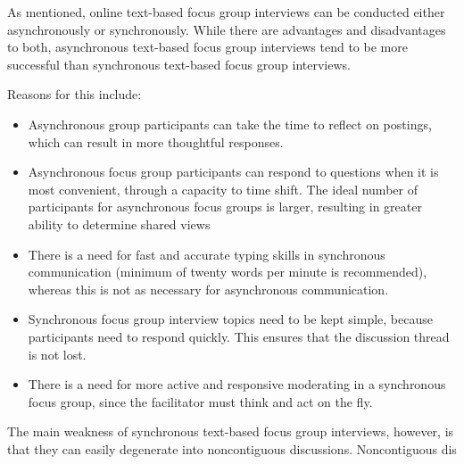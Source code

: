 \documentclass{beamer}
\begin{document}
  \begin{frame}
As mentioned, online text-based focus group interviews can be conducted either asynchronously or synchronously. While there are advantages and disadvantages to both, asynchronous text-based focus group interviews tend to be more successful than synchronous text-based focus group interviews. 

  \begin{frame}
  
Reasons for this include:
  \end{frame}

\begin{itemize}
\item Asynchronous group participants can take the time to reflect on postings, which can result in more thoughtful responses.
\item Asynchronous focus group participants can respond to questions when it is most convenient, through a capacity to time shift.
	The ideal number of participants for asynchronous focus groups is larger, resulting in greater ability to determine shared views 
\item There is a need for fast and accurate typing skills in synchronous communication (minimum of twenty words per minute is recommended), whereas this is not as necessary for asynchronous communication.
\item Synchronous focus group interview topics need to be kept simple, because participants need to respond quickly. This ensures that the discussion thread is not
	lost. 
\item There is a need for more active and responsive moderating in a synchronous
	focus group, since the facilitator must think and act on the fly.
\end{itemize}

  \end{frame}
  
\begin{frame}

The main weakness of synchronous text-based focus group interviews, however, is that they can easily degenerate into noncontiguous discussions. Noncontiguous dis
  \end{frame} 
\end{document}
